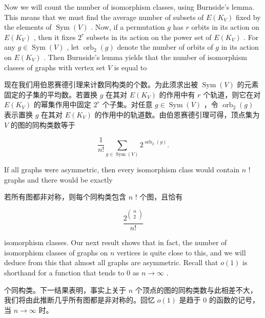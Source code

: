 \documentclass[10pt]{article}
\begin{document}
Now we will count the number of isomorphism classes, using Burnside's lemma. This means that we must find the average number of subsets of \(E\left( {K}_{V}\right)\) fixed by the elements of \(\operatorname{Sym}\left( V\right)\) . Now, if a permutation \(g\) has \(r\) orbits in its action on \(E\left( {K}_{V}\right)\) , then it fixes \({2}^{r}\) subsets in its action on the power set of \(E\left( {K}_{V}\right)\) . For any \(g \in  \operatorname{Sym}\left( V\right)\) , let \({\operatorname{orb}}_{2}\left( g\right)\) denote the number of orbits of \(g\) in its action on \(E\left( {K}_{V}\right)\) . Then Burnside’s lemma yields that the number of isomorphism classes of graphs with vertex set \(V\) is equal to

\begin{tcolorbox}\relax
现在我们用伯恩赛德引理来计数同构类的个数。为此须求出被 \(\operatorname{Sym}\left( V\right)\) 的元素固定的子集的平均数。若置换 \(g\) 在其对 \(E\left( {K}_{V}\right)\) 的作用中有 \(r\) 个轨道，则它在对 \(E\left( {K}_{V}\right)\) 的幂集作用中固定 \({2}^{r}\) 个子集。对任意 \(g \in  \operatorname{Sym}\left( V\right)\) ，令 \({\operatorname{orb}}_{2}\left( g\right)\) 表示置换 \(g\) 在其对 \(E\left( {K}_{V}\right)\) 的作用中的轨道数。由伯恩赛德引理可得，顶点集为 \(V\) 的图的同构类数等于
\end{tcolorbox}

\[
\frac{1}{n!}\mathop{\sum }\limits_{{g \in  \operatorname{Sym}\left( V\right) }}{2}^{{\operatorname{orb}}_{2}\left( g\right) }. \tag{2.1}
\]

If all graphs were asymmetric, then every isomorphism class would contain \(n\) ! graphs and there would be exactly

\begin{tcolorbox}\relax
若所有图都非对称，则每个同构类包含 \(n\) ! 个图，且恰有
\end{tcolorbox}

\[
\frac{{2}^{\left( \begin{matrix} n \\  2 \end{matrix}\right) }}{n!}
\]

isomorphism classes. Our next result shows that in fact, the number of isomorphism classes of graphs on \(n\) vertices is quite close to this, and we will deduce from this that almost all graphs are asymmetric. Recall that \(o\left( 1\right)\) is shorthand for a function that tends to 0 as \(n \rightarrow  \infty\) .

\begin{tcolorbox}\relax
个同构类。下一结果表明，事实上关于 \(n\) 个顶点的图的同构类数与此相差不大，我们将由此推断几乎所有图都是非对称的。回忆 \(o\left( 1\right)\) 是趋于 0 的函数的记号，当 \(n \rightarrow  \infty\) 时。
\end{tcolorbox}
\end{document}
